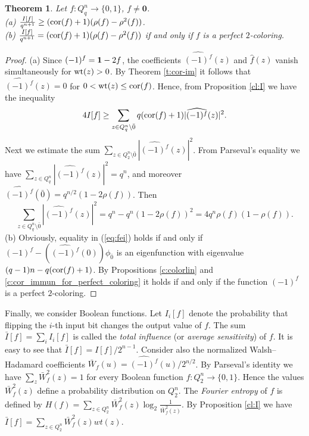 \documentclass[11pt]{article}
\newtheorem{theorem}{Theorem}[section]
\theoremstyle{definition}
\newcommand{\wt}{{\rm wt}}
\newcommand{\cor}{{\rm cor}}
\begin{document}
{{{\begin{theorem}\label{cor:X}   
  Let $f:Q_q^n\rightarrow \{0,1\}$, $f\neq \mathbf{0}$.\\
{\rm (a)} $\frac{I[f]}{q^{n+1}}\geq
(\cor(f)+1)(\rho(f)-\rho^2(f))$.\\
{\rm (b)} $\frac{I[f]}{q^{n+1}}=(\cor(f)+1)(\rho(f)-\rho^2(f))$ if and only  if $f$
is a perfect $2$-coloring.
\end{theorem}
\begin{proof}
(a) Since $(-1)^f={\bf 1}-2f$, the coefficients $\widehat{(-1)^f}(z)$ and
$\widehat{f}(z)$ vanish simultaneously for $\wt(z)>0$. By
Theorem \ref{t:cor-im} it follows that $\widehat{(-1)^f}(z)=0$ for
$0<\mathrm{wt}(z)\le \cor(f)$. Hence, from Proposition
\ref{cl:I} we have the inequality
\begin{equation}\label{eq:fei}
4I[f]\geq\sum\limits_{z\in
Q_q^n\setminus {\bar 0}}q(\cor(f)+1) |\widehat{(-1)^f}(z)|^2.
\end{equation}
Next we estimate the sum $\sum\limits_{z\in Q_2^n\setminus {\bar 0}}
|\widehat{(-1)^f}(z)|^2$. From Parseval's equality we have
$\sum\limits_{z\in Q_q^n} |\widehat{(-1)^f}(z)|^2 =q^n$, and moreover
$\widehat{(-1)^f}({\bar 0})=q^{n/2}(1-2\rho(f))$. Then
\begin{equation}\label{eq:fei1}
\sum\limits_{z\in Q_q^n\setminus {\bar 0}} |\widehat{(-1)^f}(z)|^2=
q^n-q^n(1-2\rho(f))^2=4q^{n}\rho(f)(1-\rho(f)).
\end{equation}
(b) Obviously, equality in   (\ref{eq:fei}) holds if and only if $(-1)^f-(\widehat{(-1)^f}(0))\phi_{\bar 0}$ is an eigenfunction with eigenvalue
$(q-1)n-q(\cor(f)+1)$. By Propositions \ref{c:colorlin}  and \ref{c:cor_immun_for_perfect_coloring}  it holds if and only if the function  $(-1)^f$ is a perfect $2$-coloring. 
\end{proof}

Finally, we consider Boolean functions. 
Let  $I_i[f]$ denote the probability  that flipping the $i$-th input bit changes the output value of  $f$.
The sum $\bar{I}[f]=\sum_i I_i[f]$  is called the {\sl total influence} (or {\sl average sensitivity}) of $f$.
It is easy to see that $\bar{I}[f]=I[f]/2^{n-1}$.
Consider also the normalized Walsh--Hadamard coefficients $\bar{W}_f(u)=\widehat{(-1)^f}(u)/2^{n/2}$. By Parseval's identity we have  $\sum_z\bar{W}_f^2(z)=1$  for every Boolean function $f:Q_2^n\rightarrow \{0,1\}$.
Hence the values  $\bar{W}_f^2(z)$ define a 
probability distribution on  $Q_2^n$. The {\sl Fourier entropy} of $f$ is defined by $H(f)=\sum\limits_{z\in
Q_2^n}\bar{W}_f^2(z)\log_2\frac{1}{\bar{W}_f^2(z)}$. By  Proposition \ref{cl:I} we have
$\bar{I}[f]=\sum\limits_{z\in Q_2^n}\bar{W}_f^2(z)wt(z)$.

}}}
\end{document}
